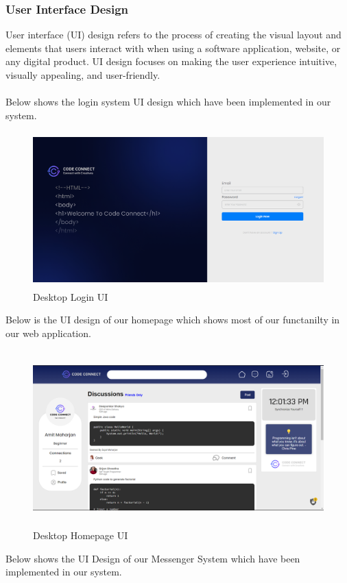 \subsubsection{User Interface Design}
User interface (UI) design refers to the process of creating the visual layout and elements that users interact with when using a software application, website, or any digital product. UI design focuses on making the user experience intuitive, visually appealing, and user-friendly. 
\\\\
Below shows the login system UI design which have been implemented in our system.
\begin{figure}[H]
    \centering
    \includegraphics[height = 6cm]{ui_diagrams/desktop_login.png}
    \caption{Desktop Login UI}
\end{figure}
Below is the UI design of our homepage which shows most of our functanilty in our web application.
\begin{figure}[H]
  \centering
  \includegraphics[height = 6.8cm]{Outcome-ss/homepage.png}
  \caption{Desktop Homepage UI}
\end{figure}
Below shows the UI Design of our Messenger System which have been implemented in our system.
